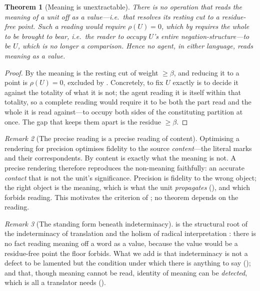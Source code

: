 \documentclass[twocolumn,11pt,a4paper]{article}
\theoremstyle{sup}
\newtheorem{theorem}{Theorem}[section]
\theoremstyle{definition}
\theoremstyle{remark}
\newtheorem{remark}[theorem]{Remark}
\newcommand{\flo}{\beta}
\newcommand{\res}{\rho}
\begin{document}
\begin{theorem}[Meaning is unextractable]
\label{thm:unextractable}
There is no operation that reads the meaning of a unit off as a value---i.e.\ that
resolves its resting cut to a residue-free point. Such a reading would require
$\res(U)=0$, which by  requires the whole to be brought
to bear, i.e.\ the reader to occupy $U$'s entire negation-structure---to
\emph{be} $U$, which is no longer a comparison. Hence no agent, in either
language, reads meaning as a value.
\end{theorem}

\begin{proof}
By  the meaning is the resting cut of weight $\ge\flo$,
and reducing it to a point is $\res(U)=0$, excluded by
. Concretely, to fix $U$ exactly is to decide it against
the totality of what it is not; the agent reading it is itself within that
totality, so a complete reading would require it to be both the part read and
the whole it is read against---to occupy both sides of the constituting
partition at once. The gap that keeps them apart is the residue $\ge\flo$.
\end{proof}

\begin{remark}[The precise reading is a precise reading of content]
\label{rem:precision}
Optimising a rendering for precision optimises fidelity to the source
\emph{content}---the literal marks and their correspondents. By
 content is exactly what the meaning is not. A precise
rendering therefore reproduces the non-meaning faithfully: an accurate
\emph{contact} that is not the unit's significance. Precision is fidelity to the
wrong object; the right object is the meaning, which is what the unit
\emph{propagates} (), and which 
forbids reading. This motivates the criterion of ; no
theorem depends on the reading.
\end{remark}

\begin{remark}[The standing form beneath indeterminacy]
\label{rem:quine}
 is the structural root of the indeterminacy of
translation \citep{quine1960} and the holism of radical interpretation
\citep{davidson1973}: there is no fact reading meaning off a word as a value,
because the value would be a residue-free point the floor forbids. What we add
is that indeterminacy is not a defect to be lamented but the condition under
which there is anything to say (); and that, though
meaning cannot be read, identity of meaning can be \emph{detected}, which is all
a translator needs ().
\end{remark}
\end{document}
